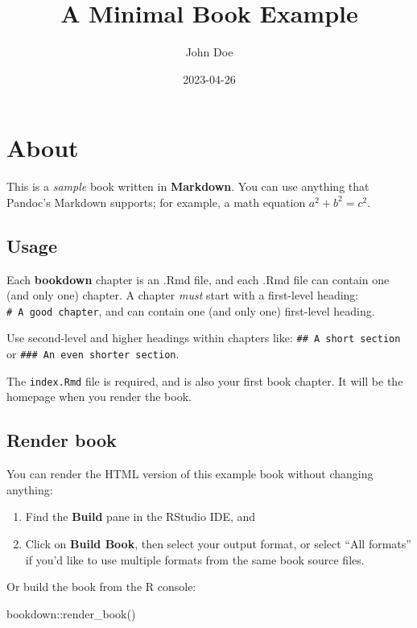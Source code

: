 \documentclass[
]{book}
\title{A Minimal Book Example}
\author{John Doe}
\date{2023-04-26}
\newenvironment{Shaded}{\begin{snugshade}}{\end{snugshade}}
\newcommand{\FunctionTok}[1]{\textcolor[rgb]{0.00,0.00,0.00}{#1}}
\newcommand{\NormalTok}[1]{#1}
\newcommand{\SpecialCharTok}[1]{\textcolor[rgb]{0.00,0.00,0.00}{#1}}
\theoremstyle{definition}
\theoremstyle{definition}
\theoremstyle{definition}
\theoremstyle{definition}
\theoremstyle{remark}
\begin{document}
\maketitle

{
\setcounter{tocdepth}{1}
\tableofcontents
}
\hypertarget{about}{%
\chapter{About}\label{about}}

This is a \emph{sample} book written in \textbf{Markdown}. You can use anything that Pandoc's Markdown supports; for example, a math equation \(a^2 + b^2 = c^2\).

\hypertarget{usage}{%
\section{Usage}\label{usage}}

Each \textbf{bookdown} chapter is an .Rmd file, and each .Rmd file can contain one (and only one) chapter. A chapter \emph{must} start with a first-level heading: \texttt{\#\ A\ good\ chapter}, and can contain one (and only one) first-level heading.

Use second-level and higher headings within chapters like: \texttt{\#\#\ A\ short\ section} or \texttt{\#\#\#\ An\ even\ shorter\ section}.

The \texttt{index.Rmd} file is required, and is also your first book chapter. It will be the homepage when you render the book.

\hypertarget{render-book}{%
\section{Render book}\label{render-book}}

You can render the HTML version of this example book without changing anything:

\begin{enumerate}
\def\labelenumi{\arabic{enumi}.}
\item
  Find the \textbf{Build} pane in the RStudio IDE, and
\item
  Click on \textbf{Build Book}, then select your output format, or select ``All formats'' if you'd like to use multiple formats from the same book source files.
\end{enumerate}

Or build the book from the R console:

\begin{Shaded}
\begin{Highlighting}[]
\NormalTok{bookdown}\SpecialCharTok{::}\FunctionTok{render\_book}\NormalTok{()}
\end{Highlighting}
\end{Shaded}
\end{document}
